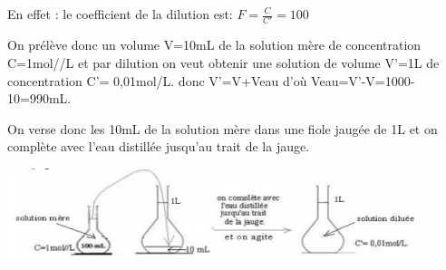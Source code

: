 \documentclass[12pt]{article}
\begin{document}
En effet : le coefficient de la dilution est:  $F = \frac{C}{C'} = 100$

On prélève donc un volume V=10mL de la solution mère de concentration C=1mol//L et par dilution on veut
obtenir une solution de volume V'=1L de concentration C'= 0,01mol/L.
donc V'=V+Veau d’où Veau=V'-V=1000-10=990mL.

On verse donc les 10mL de la solution mère dans une fiole jaugée de 1L et on complète avec l'eau distillée jusqu'au trait de la jauge.
\begin{center}
\includegraphics[width=0.9\textwidth]{./img/facteur_dilution.png}
\end{center}
\end{document}
